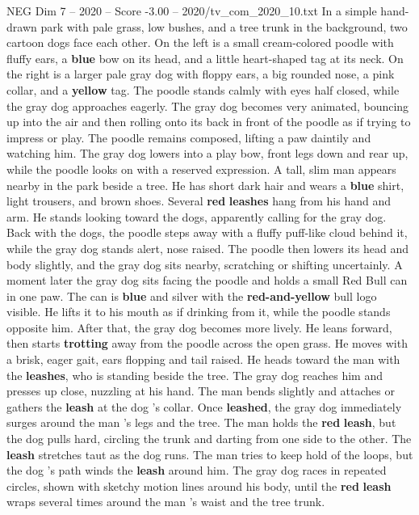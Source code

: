 \begin{textsample}{NEG Dim 7 – 2020 – Score -3.00 – 2020/tv\_com\_2020\_10.txt}  \label{ex:f7_neg_019}
In a simple hand-drawn park with pale grass, low bushes, and a tree trunk in the background, two cartoon dogs face each other.
On the left is a small cream-colored poodle with fluffy ears, a \textbf{blue} bow on its head, and a little heart-shaped tag at its neck.
On the right is a larger pale gray dog with floppy ears, a big rounded nose, a pink collar, and a \textbf{yellow} tag.
The poodle stands calmly with eyes half closed, while the gray dog approaches eagerly.
The gray dog becomes very animated, bouncing up into the air and then rolling onto its back in front of the poodle as if trying to impress or play.
The poodle remains composed, lifting a paw daintily and watching him.
The gray dog lowers into a play bow, front legs down and rear up, while the poodle looks on with a reserved expression.
A tall, slim man appears nearby in the park beside a tree.
He has short dark hair and wears a \textbf{blue} shirt, light trousers, and brown shoes.
Several \textbf{red} \textbf{leashes} hang from his hand and arm.
He stands looking toward the dogs, apparently calling for the gray dog.
Back with the dogs, the poodle steps away with a fluffy puff-like cloud behind it, while the gray dog stands alert, nose raised.
The poodle then lowers its head and body slightly, and the gray dog sits nearby, scratching or shifting uncertainly.
A moment later the gray dog sits facing the poodle and holds a small Red Bull can in one paw.
The can is \textbf{blue} and silver with the \textbf{red-and-yellow} bull logo visible.
He lifts it to his mouth as if drinking from it, while the poodle stands opposite him.
After that, the gray dog becomes more lively.
He leans forward, then starts \textbf{trotting} away from the poodle across the open grass.
He moves with a brisk, eager gait, ears flopping and tail raised.
He heads toward the man with the \textbf{leashes}, who is standing beside the tree.
The gray dog reaches him and presses up close, nuzzling at his hand.
The man bends slightly and attaches or gathers the \textbf{leash} at the dog ’s collar.
Once \textbf{leashed}, the gray dog immediately surges around the man ’s legs and the tree.
The man holds the \textbf{red} \textbf{leash}, but the dog pulls hard, circling the trunk and darting from one side to the other.
The \textbf{leash} stretches taut as the dog runs.
The man tries to keep hold of the loops, but the dog ’s path winds the \textbf{leash} around him.
The gray dog races in repeated circles, shown with sketchy motion lines around his body, until the \textbf{red} \textbf{leash} wraps several times around the man ’s waist and the tree trunk.

\end{textsample}
